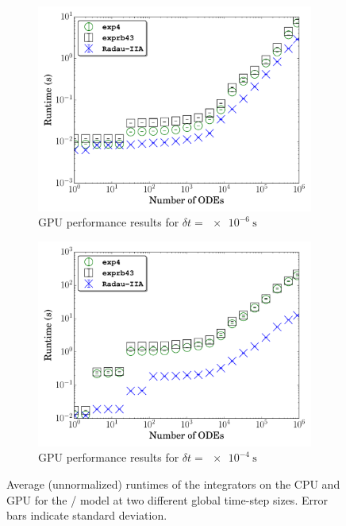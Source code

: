 \documentclass[preprint,review,11pt]{elsarticle}
\begin{document}
\begin{figure}[htb]
\begin{subfigure}{0.49\textwidth}
  \end{subfigure}\\
  \begin{subfigure}{0.49\textwidth}
      \includegraphics[width=\linewidth]{H2_1e-06_gpu_nonorm.pdf}
      \caption{GPU performance results for $\delta t = \SI{e-6}{\second}$}
  \end{subfigure}
  \begin{subfigure}{0.49\textwidth}
      \includegraphics[width=\linewidth]{H2_1e-04_gpu_nonorm.pdf}
      \caption{GPU performance results for $\delta t = \SI{e-4}{\second}$}
  \end{subfigure}
  \caption{Average (unnormalized) runtimes of the integrators on the CPU and GPU for the \slash{} model at two different global time-step sizes.
  Error bars indicate standard deviation.}
  \label{F:raw_perf_H2CO}
\end{figure}
\end{document}

